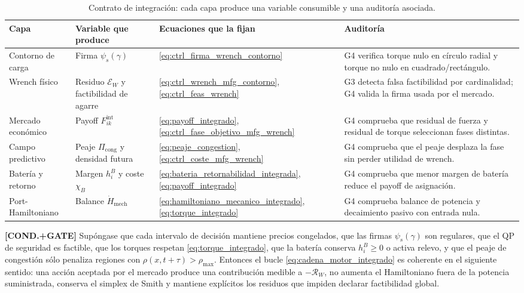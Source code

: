 \begin{table}[H]
\centering
\caption{Contrato de integración: cada capa produce una variable consumible y una
auditoría asociada.}
\label{tab:contrato-motor-integrado}
\small
\begin{tabularx}{\textwidth}{@{}>{\raggedright\arraybackslash}p{}
>{\raggedright\arraybackslash}p{}
>{\raggedright\arraybackslash}p{}
>{\raggedright\arraybackslash}X@{}}
\toprule
Capa & Variable que produce & Ecuaciones que la fijan & Auditoría \\
\midrule
Contorno de carga & Firma $\psi_s(\gamma)$ & \eqref{eq:ctrl_firma_wrench_contorno} &
G4 verifica torque nulo en círculo radial y torque no nulo en cuadrado/rectángulo. \\
Wrench físico & Residuo $\mathcal E_W$ y factibilidad de agarre &
\eqref{eq:ctrl_wrench_mfg_contorno}, \eqref{eq:ctrl_feas_wrench} &
G3 detecta falsa factibilidad por cardinalidad; G4 valida la firma usada por el mercado. \\
Mercado económico & Payoff $F_{ik}^{\mathrm{int}}$ &
\eqref{eq:payoff_integrado}, \eqref{eq:ctrl_fase_objetivo_mfg_wrench} &
G4 comprueba que residual de fuerza y residual de torque seleccionan fases distintas. \\
Campo predictivo & Peaje $\Pi_{\mathrm{cong}}$ y densidad futura &
\eqref{eq:peaje_congestion}, \eqref{eq:ctrl_coste_mfg_wrench} &
G4 comprueba que el peaje desplaza la fase sin perder utilidad de wrench. \\
Batería y retorno & Margen $h_i^B$ y coste $\chi_B$ &
\eqref{eq:bateria_retornabilidad_integrada}, \eqref{eq:payoff_integrado} &
G4 comprueba que menor margen de batería reduce el payoff de asignación. \\
Port-Hamiltoniano & Balance $\dot H_{\mathrm{mech}}$ &
\eqref{eq:hamiltoniano_mecanico_integrado}, \eqref{eq:torque_integrado} &
G4 comprueba balance de potencia y decaimiento pasivo con entrada nula. \\
\bottomrule
\end{tabularx}
\end{table}

\begin{proposicion} \textbf{[COND.+GATE]}
\label{prop:coherencia_motor_integrado}
Supóngase que cada intervalo de decisión mantiene precios congelados, que las firmas
$\psi_s(\gamma)$ son regulares, que el QP de seguridad es factible, que los torques
respetan \eqref{eq:torque_integrado}, que la batería conserva $h_i^B\ge0$ o activa relevo,
y que el peaje de congestión sólo penaliza regiones con $\rho(x,t+\tau)>\rho_{\max}$.
Entonces el bucle \eqref{eq:cadena_motor_integrado} es coherente en el siguiente sentido:
una acción aceptada por el mercado produce una contribución medible a
$-\mathcal R_W$, no aumenta el Hamiltoniano fuera de la potencia suministrada, conserva
el simplex de Smith y mantiene explícitos los residuos que impiden declarar factibilidad
global.
\end{proposicion}

